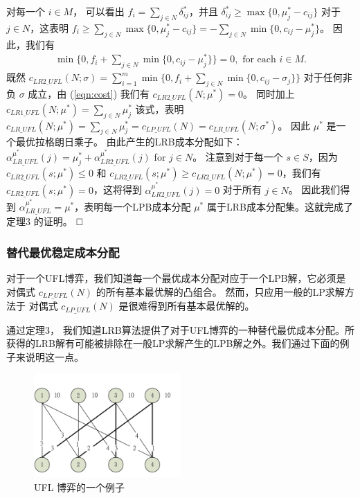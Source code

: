 \documentclass[UTF8]{article}
\begin{document}
\begin{定义}
      对每一个 $i\in M$， 可以看出 $f_i = \sum_{j\in N}\delta^*_{ij}$，并且 $\delta^*_{ij}\geq \max\{0,\mu^*_j-c_{ij}\}$ 对于 $j \in N$，这表明 $f_i \geq \sum_{j\in N}\max\{0,\mu^*_j-c_{ij}\}=-\sum_{j\in N}\min\{0,c_{ij}-\mu^*_j\}$。
      因此，我们有
      \begin{eqnarray}
        \min\{0,f_i + \sum_{j\in N}\min\{0,c_{ij}-\mu^*_j\}\} =0, \mbox{ for each $i\in M$.} \label{eqn:cost}
      \end{eqnarray}
      既然 $c_{LR2\_UFL}(N;\sigma)=\sum_{i=1}^{m}\min\{0,f_i+\sum_{j\in N}\min\{0,c_{ij}-\sigma_{j}\}\}$ 对于任何非负 $\sigma$ 成立，由 (\ref{eqn:cost}) 我们有 $c_{LR2\_UFL}(N;\mu^*) = 0$。
      同时加上 $c_{LR1\_UFL}(N;\mu^*)=\sum_{j\in N}\mu^*_j$ 该式，表明 $c_{LR\_UFL}(N;\mu^*) = \sum_{j\in N}\mu^*_j = c_{LP\_UFL}(N)=c_{LR\_UFL}(N;\sigma^*)$。
      因此 $\mu^*$ 是一个最优拉格朗日乘子。
      由此产生的LRB成本分配如下：$\alpha^{\mu^*}_{LR\_UFL}(j) = \mu^*_j + \alpha^{\mu^*}_{LR2\_UFL}(j)$ for $j \in N$。
      注意到对于每一个 $s\in S$，因为 $c_{LR2\_UFL}(s;\mu^*)\leq 0$ 和 $c_{LR2\_UFL}(s;\mu^*)\geq c_{LR2\_UFL}(N;\mu^*)=0$，我们有 $c_{LR2\_UFL}(s;\mu^*)=0$，这将得到 $\alpha^{\mu^*}_{LR2\_UFL}(j) = 0$ 对于所有 $j\in N$。
      因此我们得到 $\alpha^{\mu^*}_{LR\_UFL} = \mu^*$，表明每一个LPB成本分配 $\mu^*$ 属于LRB成本分配集。这就完成了定理3 的证明。
      $\hfill\square$

      \subsubsection{替代最优稳定成本分配}\label{section:uflcomputation}
      对于一个UFL博弈，我们知道每一个最优成本分配对应于一个LPB解，它必须是对偶式 $c_{LP\_UFL}(N)$ 的所有基本最优解的凸组合。 然而，只应用一般的LP求解方法于 对偶式 $c_{LP\_UFL}(N)$ 是很难得到所有基本最优解的。

      通过定理3， 我们知道LRB算法提供了对于UFL博弈的一种替代最优成本分配。所获得的LRB解有可能被排除在一般LP求解产生的LPB解之外。我们通过下面的例子来说明这一点。

      \begin{figure}[H]
      \centering
      \vspace{-0.1em}
      \includegraphics[width=0.5\textwidth]{figure-1.pdf}
      \caption{\label{figure:exampleUFL} UFL 博弈的一个例子}
      \vspace{-3mm}
      \end{figure}


\end{定义}
\end{document}
